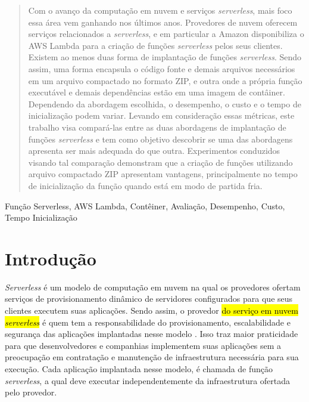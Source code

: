 \documentclass[10pt,conference]{IEEEtran}
\begin{document}
\begin{abstract}
 Com o avanço da computação em nuvem e serviços \textit{serverless}, mais foco essa área vem ganhando nos últimos anos. Provedores de nuvem oferecem serviços relacionados a \textit{serverless}, e em particular a Amazon disponibiliza o AWS Lambda para a criação de funções \textit{serverless} pelos seus clientes. Existem ao menos duas forma de implantação de funções \textit{serverless}. Sendo assim, uma forma encapsula o código fonte e demais arquivos necessários em um arquivo compactado no formato ZIP, e outra onde a própria função executável e demais dependências estão em uma imagem de contâiner. Dependendo da abordagem escolhida, o desempenho, o custo e o tempo de inicialização podem variar. Levando em consideração essas métricas, este trabalho visa compará-las entre as duas abordagens de implantação de funções \textit{serverless} e tem como objetivo descobrir se uma das abordagens apresenta ser mais adequada do que outra. Experimentos conduzidos visando tal comparação demonstram que a criação de funções utilizando arquivo compactado ZIP apresentam vantagens, principalmente no tempo de inicialização da função quando está em modo de partida fria.
\end{abstract}

\renewcommand\IEEEkeywordsname{Palavras-chave}

\begin{IEEEkeywords}
Função Serverless, AWS Lambda, Contêiner, Avaliação, Desempenho, Custo, Tempo Inicialização
\end{IEEEkeywords}


\IEEEpeerreviewmaketitle



\section{Introdução}
\label{sec:Intro}

\textit{Serverless} é um modelo de computação em nuvem na qual os provedores ofertam serviços de provisionamento dinâmico de servidores configurados para que seus clientes executem suas aplicações. Sendo assim, o provedor \hl{do serviço em nuvem \textit{serverless}} é quem tem a responsabilidade do provisionamento, escalabilidade e segurança das aplicações implantadas nesse modelo \cite{Nupponen_2020_serverless_what_it_is}.
Isso traz maior praticidade para que desenvolvedores e companhias implementem suas aplicações sem a preocupação em contratação e manutenção de infraestrutura necessária para sua execução. 
Cada aplicação implantada nesse modelo, é chamada de função \textit{serverless}, a qual deve executar independentemente da infraestrutura ofertada pelo provedor.
\end{document}
